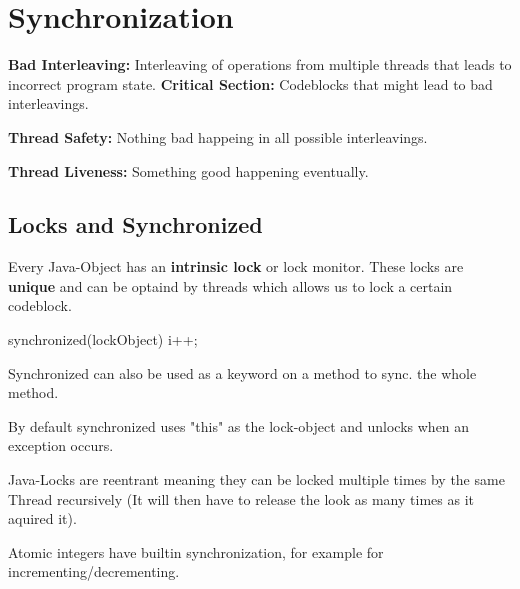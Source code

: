 \section{Synchronization}


\begin{definition}
\textbf{Bad Interleaving:} Interleaving of operations from multiple threads that leads to incorrect program state.
\textbf{Critical Section:} Codeblocks that might lead to bad interleavings.
\end{definition}

\begin{definition}
\textbf{Thread Safety:} Nothing bad happeing in all possible interleavings.
\end{definition}

\begin{definition}
\textbf{Thread Liveness:} Something good happening eventually.
\end{definition}

\subsection{Locks and Synchronized}

Every Java-Object has an \textbf{intrinsic lock} or lock monitor. These locks are \textbf{unique} and can be optaind by
threads which allows us to lock a certain codeblock. 

\begin{codeexample}
synchronized(lockObject) {
    i++;
}
\end{codeexample}

\begin{remark}
Synchronized can also be used as a keyword on a method to sync. the whole method.
\end{remark}

\begin{remark}
By default synchronized uses "this" as the lock-object and unlocks when an exception occurs.
\end{remark}

\begin{remark}
Java-Locks are reentrant meaning they can be locked multiple times by the same Thread recursively (It
will then have to release the look as many times as it aquired it).            
\end{remark}

Atomic integers have builtin synchronization, for example for incrementing/decrementing.

